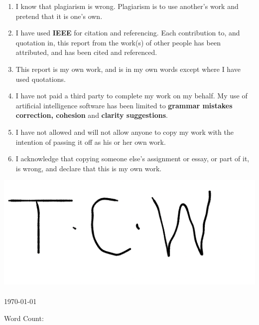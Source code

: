 {}

\begin{enumerate}
  \item I know that plagiarism is wrong. Plagiarism is to use another's work and pretend that it is one's own.
  \item I have used \textbf{IEEE} for citation and referencing. Each contribution to, and quotation in, this report from the work(s) of other people has been attributed, and has been cited and referenced.
  \item This report is my own work, and is in my own words except where I have used quotations.
  \item I have not paid a third party to complete my work on my behalf. My use of artificial intelligence software has been limited to \textbf{grammar mistakes correction, cohesion} and \textbf{clarity suggestions}.
  \item I have not allowed and will not allow anyone to copy my work with the intention of passing it off as his or her own work.
  \item I acknowledge that copying someone else’s assignment or essay, or part of it, is wrong, and declare that this is my own work.
\end{enumerate}





\begin{flushright}
  \includegraphics[width=0.3\linewidth]{2_Preface/Travimadox.png}\\[1ex]%
  \Author\\
  \today
\end{flushright}

\vspace{0.5em}

\noindent Word Count: 

    
  \vfill\vfill\vfill

